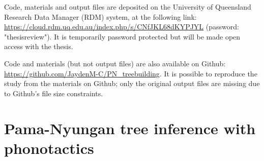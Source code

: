 Code, materials and output files are deposited on the University of Queensland Research Data Manager (RDM) system, at the following link: \href{https://cloud.rdm.uq.edu.au/index.php/s/CNfJKL68dKYPJYL}{https://cloud.rdm.uq.edu.au/index.php/s/CNfJKL68dKYPJYL} (password: "thesisreview"). It is temporarily password protected but will be made open access with the thesis.

Code and materials (but not output files) are also available on Github: \href{https://github.com/JaydenM-C/PN\_treebuilding}{https://github.com/JaydenM-C/PN\_treebuilding}. It is possible to reproduce the study from the materials on Github; only the original output files are missing due to Github's file size constraints.


\chapter[Pama-Nyungan tree inference with phonotactics]{Pama-Nyungan tree inference with phonotactics}
\label{ch-tree-inference}	%
\pagestyle{headings}



